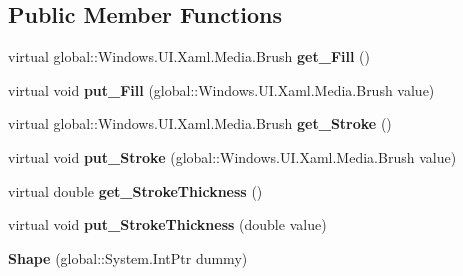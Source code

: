 \subsection*{Public Member Functions}
\begin{DoxyCompactItemize}
\item 
\mbox{\label{class_windows_1_1_u_i_1_1_xaml_1_1_shapes_1_1_shape_a10c17e0315cc803297aef00e98586e85}} 
virtual global\+::\+Windows.\+U\+I.\+Xaml.\+Media.\+Brush {\bfseries get\+\_\+\+Fill} ()
\item 
\mbox{\label{class_windows_1_1_u_i_1_1_xaml_1_1_shapes_1_1_shape_ab293dba968233df2740d66a0e1f23957}} 
virtual void {\bfseries put\+\_\+\+Fill} (global\+::\+Windows.\+U\+I.\+Xaml.\+Media.\+Brush value)
\item 
\mbox{\label{class_windows_1_1_u_i_1_1_xaml_1_1_shapes_1_1_shape_ac48e00b135fa8e1130bee32942bbee5c}} 
virtual global\+::\+Windows.\+U\+I.\+Xaml.\+Media.\+Brush {\bfseries get\+\_\+\+Stroke} ()
\item 
\mbox{\label{class_windows_1_1_u_i_1_1_xaml_1_1_shapes_1_1_shape_a801ec283f413b3ba03d57ce8b2bccdc0}} 
virtual void {\bfseries put\+\_\+\+Stroke} (global\+::\+Windows.\+U\+I.\+Xaml.\+Media.\+Brush value)
\item 
\mbox{\label{class_windows_1_1_u_i_1_1_xaml_1_1_shapes_1_1_shape_a758d9f0e1b12c843580d28f3254f63ca}} 
virtual double {\bfseries get\+\_\+\+Stroke\+Thickness} ()
\item 
\mbox{\label{class_windows_1_1_u_i_1_1_xaml_1_1_shapes_1_1_shape_a3bfb547dd85a92a03c0f72a2ca6af30d}} 
virtual void {\bfseries put\+\_\+\+Stroke\+Thickness} (double value)
\item 
\mbox{\label{class_windows_1_1_u_i_1_1_xaml_1_1_shapes_1_1_shape_aef3c79f20646c23080a348eb29a0394e}} 
{\bfseries Shape} (global\+::\+System.\+Int\+Ptr dummy)
\item 

\end{DoxyCompactItemize}
